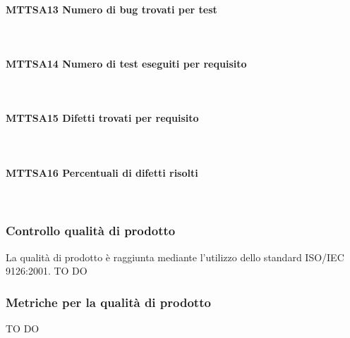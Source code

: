 \paragraph{MTTSA13 Numero di bug trovati per test}\-\\

\paragraph{MTTSA14 Numero di test eseguiti per requisito}\-\\

\paragraph{MTTSA15 Difetti trovati per requisito}\-\\

\paragraph{MTTSA16 Percentuali di difetti risolti}\-\\

\subsubsection{Controllo qualità di prodotto}
La qualità di prodotto è raggiunta mediante l'utilizzo dello standard ISO/IEC 9126:2001. TO DO

\subsubsection{Metriche per la qualità di prodotto}
TO DO



